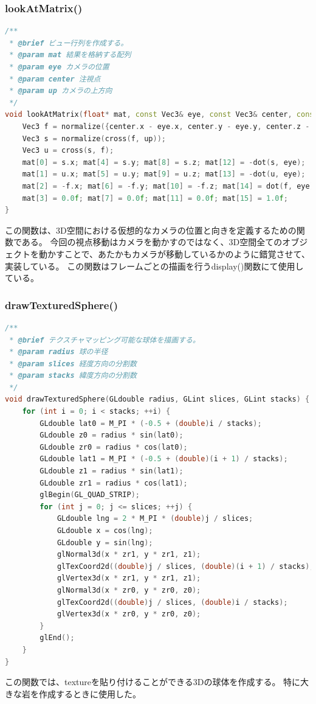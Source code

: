 \documentclass[uplatex,dvipdfmx,a4paper]{jsarticle}
\begin{document}
\hypertarget{func:lookAtMatrix}{}\subsubsection{lookAtMatrix()}\label{func:lookAtMatrix}
\begin{lstlisting}[language=C++, caption={lookAtMatrix() 関数}, label={lst:lookAtMatrix_detail}]
/**
 * @brief ビュー行列を作成する。
 * @param mat 結果を格納する配列
 * @param eye カメラの位置
 * @param center 注視点
 * @param up カメラの上方向
 */
void lookAtMatrix(float* mat, const Vec3& eye, const Vec3& center, const Vec3& up) {
    Vec3 f = normalize({center.x - eye.x, center.y - eye.y, center.z - eye.z});
    Vec3 s = normalize(cross(f, up));
    Vec3 u = cross(s, f);
    mat[0] = s.x; mat[4] = s.y; mat[8] = s.z; mat[12] = -dot(s, eye);
    mat[1] = u.x; mat[5] = u.y; mat[9] = u.z; mat[13] = -dot(u, eye);
    mat[2] = -f.x; mat[6] = -f.y; mat[10] = -f.z; mat[14] = dot(f, eye);
    mat[3] = 0.0f; mat[7] = 0.0f; mat[11] = 0.0f; mat[15] = 1.0f;
}
\end{lstlisting}
この関数は、3D空間における仮想的なカメラの位置と向きを定義するための関数である。
今回の視点移動はカメラを動かすのではなく、3D空間全てのオブジェクトを動かすことで、あたかもカメラが移動しているかのように錯覚させて、実装している。
この関数はフレームごとの描画を行うdisplay()関数にて使用している。

\hypertarget{func:drawTexturedSphere}{}\subsubsection{drawTexturedSphere()}\label{func:drawTexturedSphere}
\begin{lstlisting}[language=C++, caption={drawTexturedSphere() 関数}, label={lst:drawTexturedSphere_detail}]
/**
 * @brief テクスチャマッピング可能な球体を描画する。
 * @param radius 球の半径
 * @param slices 経度方向の分割数
 * @param stacks 緯度方向の分割数
 */
void drawTexturedSphere(GLdouble radius, GLint slices, GLint stacks) {
    for (int i = 0; i < stacks; ++i) {
        GLdouble lat0 = M_PI * (-0.5 + (double)i / stacks);
        GLdouble z0 = radius * sin(lat0);
        GLdouble zr0 = radius * cos(lat0);
        GLdouble lat1 = M_PI * (-0.5 + (double)(i + 1) / stacks);
        GLdouble z1 = radius * sin(lat1);
        GLdouble zr1 = radius * cos(lat1);
        glBegin(GL_QUAD_STRIP);
        for (int j = 0; j <= slices; ++j) {
            GLdouble lng = 2 * M_PI * (double)j / slices;
            GLdouble x = cos(lng);
            GLdouble y = sin(lng);
            glNormal3d(x * zr1, y * zr1, z1);
            glTexCoord2d((double)j / slices, (double)(i + 1) / stacks);
            glVertex3d(x * zr1, y * zr1, z1);
            glNormal3d(x * zr0, y * zr0, z0);
            glTexCoord2d((double)j / slices, (double)i / stacks);
            glVertex3d(x * zr0, y * zr0, z0);
        }
        glEnd();
    }
}
\end{lstlisting}
この関数では、textureを貼り付けることができる3Dの球体を作成する。
特に大きな岩を作成するときに使用した。
\end{document}
